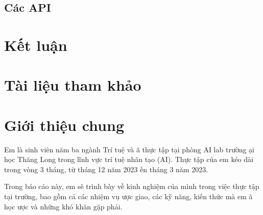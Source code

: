 \documentclass{article}
\begin{document}
\subsection{Các API}

\section{Kết luận}
\section{Tài liệu tham khảo}

\newpage
\setcounter{section}{0}
\section{ Giới thiệu chung}

\noindent
\noindent Em l\`{a} sinh vi\^{e}n n\u{a}m ba ng\`{a}nh Tr\'{i} tuệ v\`{a} {\dj}\~{a} thực tập tại ph\`{o}ng AI lab trường {\DJ}ại học Th\u{a}ng Long trong l\~{i}nh vực tr\'{i} tuệ nh\^{a}n tạo (AI). Thực tập của em k\'{e}o d\`{a}i trong v\`{o}ng 3 th\'{a}ng, từ th\'{a}ng 12 n\u{a}m 2023 {\dj}ến th\'{a}ng 3 n\u{a}m 2023.

\noindent Trong b\'{a}o c\'{a}o n\`{a}y, em sẽ tr\`{i}nh b\`{a}y về kinh nghiệm của m\`{i}nh trong việc thực tập tại trường, bao gồm cả c\'{a}c nhiệm vụ {\dj}ược giao, c\'{a}c kỹ n\u{a}ng, kiến thức m\`{a} em {\dj}\~{a} học {\dj}ược v\`{a} những kh\'{o} kh\u{a}n gặp phải.
\end{document}
